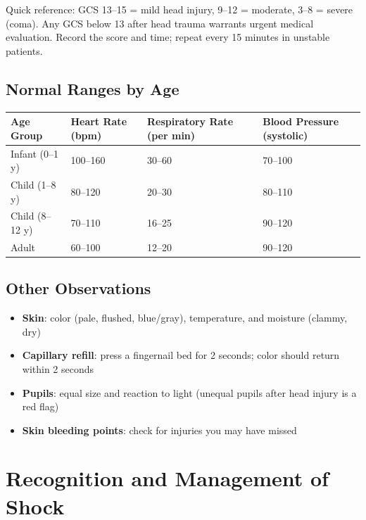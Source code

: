 Quick reference: GCS 13--15 = mild head injury, 9--12 = moderate, 3--8 = severe (coma). Any GCS below 13 after head trauma warrants urgent medical evaluation. Record the score and time; repeat every 15 minutes in unstable patients.

\subsection{Normal Ranges by Age}

\begin{center}
\small
\begin{tabular}{@{}llll@{}}
\hline
\textbf{Age Group} & \textbf{Heart Rate (bpm)} & \textbf{Respiratory Rate (per min)} & \textbf{Blood Pressure (systolic)} \\
\hline
Infant (0--1 y) & 100--160 & 30--60 & 70--100 \\
Child (1--8 y) & 80--120 & 20--30 & 80--110 \\
Child (8--12 y) & 70--110 & 16--25 & 90--120 \\
Adult & 60--100 & 12--20 & 90--120 \\
\hline
\end{tabular}
\end{center}


\subsection{Other Observations}

\begin{itemize}[leftmargin=*]
\item \textbf{Skin}: color (pale, flushed, blue/gray), temperature, and moisture (clammy, dry)
\item \textbf{Capillary refill}: press a fingernail bed for 2 seconds; color should return within 2 seconds
\item \textbf{Pupils}: equal size and reaction to light (unequal pupils after head injury is a red flag)
\item \textbf{Skin bleeding points}: check for injuries you may have missed
\end{itemize}

\section{Recognition and Management of Shock}


